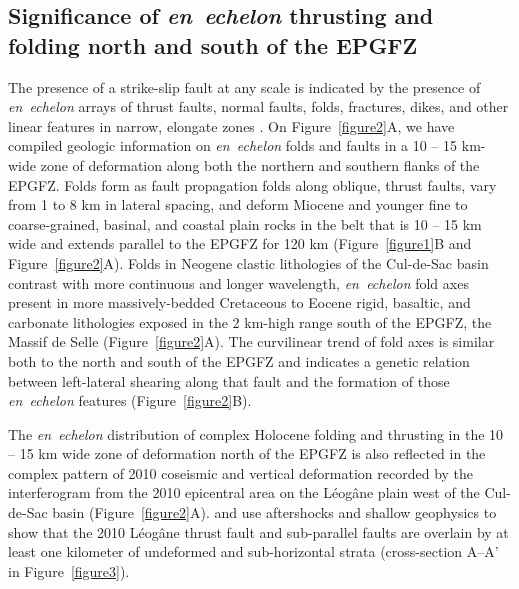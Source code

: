 \documentclass[linenumbers,draft]{agujournal}
\begin{document}
\subsection{Significance of \textit{en~echelon} thrusting and folding north and south of the EPGFZ}
The presence of a strike-slip fault at any scale is indicated by the presence of \textit{en~echelon} arrays of thrust faults, normal faults, folds, fractures, dikes, and other linear features in narrow, elongate zones \citep{sylvester1988strike}. On Figure~\ref{figure2}A, we have compiled geologic information on \textit{en~echelon} folds and faults in a 10 -- 15 km-wide zone of deformation along both the northern and southern flanks of the EPGFZ. Folds form as fault propagation folds along oblique, thrust faults, vary from 1 to 8 km in lateral spacing, and deform Miocene and younger fine to coarse-grained, basinal, and coastal plain rocks in the belt that is 10 -- 15 km wide and extends parallel to the EPGFZ for 120 km (Figure~\ref{figure1}B and Figure~\ref{figure2}A). Folds in Neogene clastic lithologies of the Cul-de-Sac basin contrast with more continuous and longer wavelength, \textit{en~echelon} fold axes present in more massively-bedded Cretaceous to Eocene rigid, basaltic, and carbonate lithologies exposed in the 2 km-high range south of the EPGFZ, the Massif de Selle (Figure~\ref{figure2}A). The curvilinear trend of fold axes is similar both to the north and south of the EPGFZ and indicates a genetic relation between left-lateral shearing along that fault and the formation of those \textit{en~echelon} features (Figure~\ref{figure2}B). 

The \textit{en~echelon} distribution of complex Holocene folding and thrusting in the 10 -- 15 km wide zone of deformation north of the EPGFZ is also reflected in the complex pattern of 2010 coseismic and vertical deformation recorded by the interferogram from the 2010 epicentral area on the L\'eog\^ane plain west of the Cul-de-Sac basin \citep{hayes2010complex,hashimoto2011fan,bilham2013remote} (Figure~\ref{figure2}A). \citet{douilly2013crustal,douilly2015three} and \citet{kocel2016near} use aftershocks and shallow geophysics to show that the 2010 L\'eog\^ane thrust fault and sub-parallel faults are overlain by at least one kilometer of undeformed and sub-horizontal strata (cross-section A--A' in Figure~\ref{figure3}).
\end{document}
